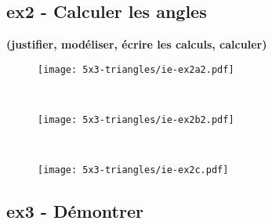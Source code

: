 \Pointilles[14] 


\newpage

\subsection*{ex2 - Calculer les angles}
\textbf{(justifier, modéliser, écrire les calculs, calculer)}

\begin{minipage}[t]{0.4\textwidth}
  \begin{figure}[H]
    \centering
    \texttt{[image: 5x3-triangles/ie-ex2a2.pdf]}
  \end{figure}

\end{minipage}
\begin{minipage}[t]{0.6\textwidth}

  \Pointilles[8] \\
\end{minipage}

\begin{minipage}[t]{0.4\textwidth}
  \begin{figure}[H]
    \centering
    \texttt{[image: 5x3-triangles/ie-ex2b2.pdf]}
  \end{figure} 

\end{minipage}
\begin{minipage}[t]{0.6\textwidth}

  \Pointilles[8] \\
\end{minipage}

\begin{minipage}[t]{0.4\textwidth}
\begin{figure}[H]
    \centering
    \texttt{[image: 5x3-triangles/ie-ex2c.pdf]}
  \end{figure} 

\end{minipage}
\begin{minipage}[t]{0.6\textwidth}

  \Pointilles[8]
\end{minipage}



\subsection*{ex3 - Démontrer}

